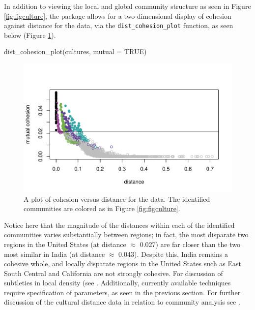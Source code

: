 In addition to viewing the local and global community structure as seen
in Figure \ref{fig:figculture}, the  package allows for a
two-dimensional display of cohesion against distance for the data, via
the \texttt{dist\_cohesion\_plot} function, as seen below (Figure
\ref{fig:figco}).

\begin{Schunk}
\begin{Sinput}
dist_cohesion_plot(cultures, mutual = TRUE)
\end{Sinput}
\begin{figure}[H]
\includegraphics[width=5.5in,trim=0in 0.5in 0in 0.5in,clip]{dagostino-mcgowan_files/figure-latex/figco-1} \caption{A plot of cohesion versus distance for the data. The identified communities are colored as in Figure \ref{fig:figculture}.}\label{fig:figco}
\end{figure}
\end{Schunk}

Notice here that the magnitude of the distances within each of the
identified communities varies substantially between regions; in fact,
the most disparate two regions in the United States (at distance
\(\approx\) 0.027) are far closer than the two most similar in India (at
distance \(\approx\) 0.043). Despite this, India remains a cohesive
whole, and locally disparate regions in the United States such as East
South Central and California are not strongly cohesive. For discussion
of subtleties in local density (see \citet{berenhaut2022social}.
Additionally, currently available techniques require specification of
parameters, as seen in the previous section. For further discussion of
the cultural distance data in relation to community analysis see
\citet{berenhaut2022social}.

